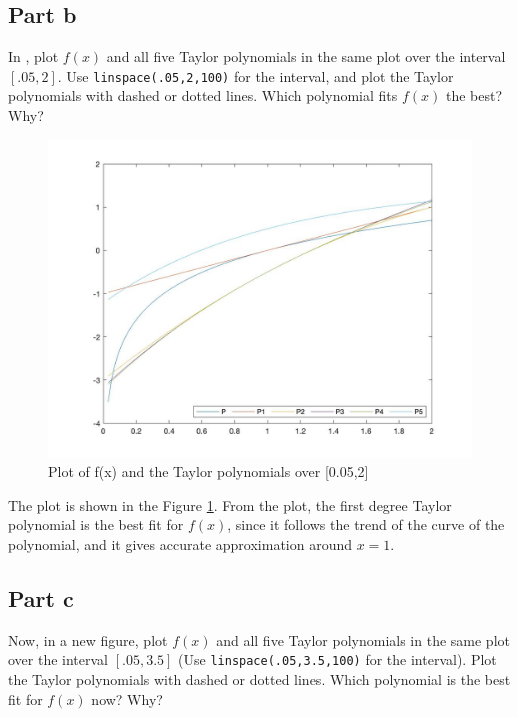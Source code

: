 \subsection{Part b}

\begin{question}
    In \MATLAB, plot $f(x)$ and all five Taylor polynomials in the same plot over the interval $[.05,2]$. Use \verb+linspace(.05,2,100)+ for the interval, and plot the Taylor polynomials with dashed or dotted lines. Which polynomial fits $f(x)$ the best? Why?
\end{question}

\begin{answer}
    \begin{figure}[H]
        \centering
        \includegraphics[width=1.0\textwidth]{Figure 3.jpg}
        \caption{\label{fig:fig3}Plot of f(x) and the Taylor polynomials over [0.05,2]}
    \end{figure}
    The plot is shown in the Figure \ref{fig:fig3}. From the plot, the first degree Taylor polynomial is the best fit for $f(x)$, since it follows the trend of the curve of the polynomial, and it gives accurate approximation around $x = 1$.
\end{answer}

\subsection{Part c}

\begin{question}
    Now, in a new figure, plot $f(x)$ and all five Taylor polynomials in the same plot over the interval $[.05,3.5]$ (Use \verb+linspace(.05,3.5,100)+ for the interval). Plot the Taylor polynomials with dashed or dotted lines. Which polynomial is the best fit for $f(x)$ now? Why?
\end{question}

